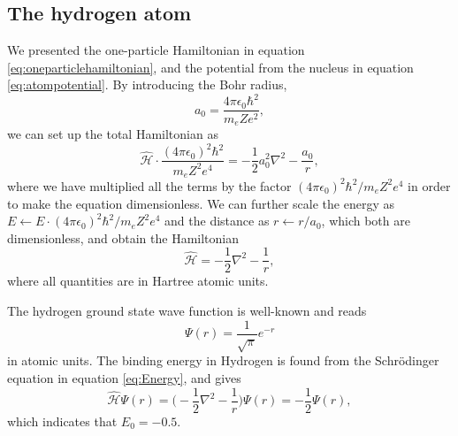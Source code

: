 \subsection{The hydrogen atom} \label{sec:hydrogen}
We presented the one-particle Hamiltonian in equation \eqref{eq:oneparticlehamiltonian}, and the potential from the nucleus in equation \eqref{eq:atompotential}. By introducing the Bohr radius,
\begin{equation}
a_0=\frac{4\pi\epsilon_0\hbar^2}{m_eZe^2},
\end{equation}
we can set up the total Hamiltonian as
\begin{equation}
\hat{\mathcal{H}}\cdot\frac{(4\pi\epsilon_0)^2\hbar^2}{m_eZ^2e^4}=-\frac{1}{2}a_0^2\nabla^2-\frac{a_0}{r},
\end{equation}
where we have multiplied all the terms by the factor $(4\pi\epsilon_0)^2\hbar^2/m_eZ^2e^4$ in order to make the equation dimensionless. We can further scale the energy as $E\leftarrow E\cdot (4\pi\epsilon_0)^2\hbar^2/m_eZ^2e^4$ and the distance as $r\leftarrow r/a_0$, which both are dimensionless, and obtain the Hamiltonian
\begin{equation}
\hat{\mathcal{H}}=-\frac{1}{2}\nabla^2-\frac{1}{r},
\end{equation}
where all quantities are in Hartree atomic units.

The hydrogen ground state wave function is well-known and reads
\begin{equation}
\Psi(r)=\frac{1}{\sqrt{\pi}}e^{-r}
\end{equation}
in atomic units. The binding energy in Hydrogen is found from the Schrödinger equation in equation \eqref{eq:Energy}, and gives
\begin{equation}
\hat{\mathcal{H}}\Psi(r)=\bigg(-\frac{1}{2}\nabla^2-\frac{1}{r}\bigg)\Psi(r)=-\frac{1}{2}\Psi(r),
\end{equation}
which indicates that $E_0=-0.5$.

